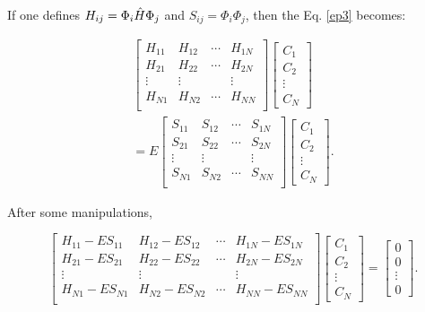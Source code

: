 \documentclass[a4paper, 12pt, titlepage,oneside,drop]{kthesis}
\begin{document}
If one defines $H_{ij} = \Phi_i \hat{H} \Phi_j$ and $S_{ij} = \Phi_i \Phi_j$, then the Eq. \ref{ep3} becomes:

\begin{equation}\begin{split}\label{ep4}
\left[
\begin{matrix}
    H_{11} & H_{12} & \cdots & H_{1N} \\
    H_{21} & H_{22} & \cdots & H_{2N} \\
    \vdots               & \vdots               &        & \vdots               \\
     H_{N1} & H_{N2} & \cdots & H_{NN} \\
\end{matrix} \right] \left[ \begin{array}{c} C_1 \\ C_2 \\ \vdots \\ C_N\end{array} \right] \\
=E \left[
\begin{matrix}
    S_{11} & S_{12} & \cdots & S_{1N} \\
    S_{21} & S_{22} & \cdots & S_{2N} \\
    \vdots               & \vdots               &        & \vdots               \\
     S_{N1} & S_{N2} & \cdots & S_{NN} \\
\end{matrix} \right]\left[ \begin{array}{c} C_1 \\ C_2 \\ \vdots \\ C_N\end{array} \right].
\end{split}\end{equation}

After some manipulations, 

\begin{equation}\label{ep44}
\left[
\begin{matrix}
    H_{11} - E S_{11} & H_{12} - E S_{12} & \cdots & H_{1N} - E S_{1N} \\
   H_{21} - E S_{21} & H_{22} - E S_{22} & \cdots & H_{2N} - E S_{2N} \\
    \vdots               & \vdots               &        & \vdots               \\
  H_{N1} - E S_{N1} & H_{N2} - E S_{N2} & \cdots & H_{NN} - E S_{NN} \\
\end{matrix} \right] \left[ \begin{array}{c} C_1 \\ C_2 \\ \vdots \\ C_N\end{array} \right]
=\left[ \begin{array}{c} 0 \\ 0 \\ \vdots \\ 0 \end{array} \right].
\end{equation}
\end{document}
